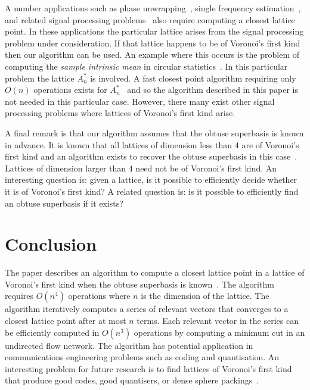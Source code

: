\documentclass[final,leqno]{siamltex}
\begin{document}
A number applications such as phase unwrapping~\cite{Teunissen_GPS_1995,Hassibi_GPS_1998}, single frequency estimation~\cite{McKilliamFrequencyEstimationByPhaseUnwrapping2009}, and related signal processing problems~\cite{McKilliam2007,Clarkson2007,McKilliam2009IndentifiabliltyAliasingPolyphase,Quinn_sparse_noisy_SSP_2012} also require computing a closest lattice point.  In these applications the particular lattice arises from the signal processing problem under consideration.  If that lattice happens to be of Voronoi's first kind then our algorithm can be used.  An example where this occurs is the problem of computing the \emph{sample intrinsic mean} in circular statistics~\cite{McKilliam_mean_dir_est_sq_arc_length2010}.  In this particular problem the lattice $A_n^*$ is involved.  A fast closest point algorithm requiring only $O(n)$ operations exists for $A_n^*$~\cite{McKilliam2009CoxeterLattices,McKilliam2008b} and so the algorithm described in this paper is not needed in this particular case.  However, there many exist other signal processing problems where lattices of Voronoi's first kind arise.

A final remark is that our algorithm assumes that the obtuse superbasis is known in advance.  It is known that all lattices of dimension less than 4 are of Voronoi's first kind and an algorithm exists to recover the obtuse superbasis in this case~\cite{SPLAG}.  Lattices of dimension larger than 4 need not be of Voronoi's first kind.  An interesting question is: given a lattice, is it possible to efficiently decide whether it is of Voronoi's first kind?  A related question is: is it possible to efficiently find an obtuse superbasis if it exists?


\section{Conclusion}

The paper describes an algorithm to compute a closest lattice point in a lattice of Voronoi's first kind when the obtuse superbasis is known~\cite{ConwaySloane1992_voronoi_lattice_3d_obtuse_superbases}.  The algorithm requires $O(n^4)$ operations where $n$ is the dimension of the lattice.  The algorithm iteratively computes a series of relevant vectors that converges to a closest lattice point after at most $n$ terms.   Each relevant vector in the series can be efficiently computed in $O(n^3)$ operations by computing a minimum cut in an undirected flow network.  The algorithm has potential application in communications engineering problems such as coding and quantisation.  An interesting problem for future research is to find lattices of Voronoi's first kind that produce good codes, good quantisers, or dense sphere packings~\cite{SPLAG,Conway1982VoronoiRegions}.


\end{document}
